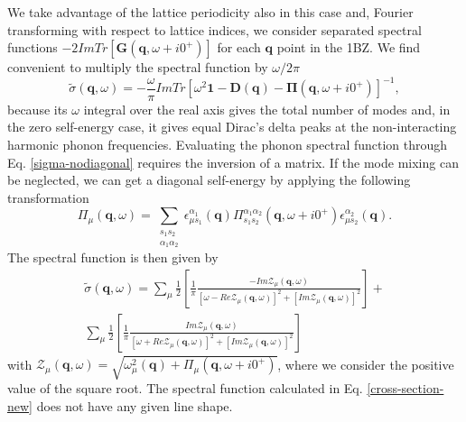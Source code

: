 We take advantage of the lattice periodicity also in this case and, Fourier transforming with respect to lattice indices, we consider separated spectral functions $-2ImTr[\boldsymbol{G}(\boldsymbol{q},\omega+i0^{+})]$ for 
each $\boldsymbol{q}$ point in the 1BZ. We find convenient to multiply the spectral function by $\omega/2\pi$
\begin{equation}
\label{sigma-nodiagonal}
\tilde{\sigma}(\mathbf{q},\omega)=-\frac{\omega}{\pi}ImTr[\omega^{2}\boldsymbol{1}-\mathbf{D}(\mathbf{q})-\boldsymbol{\Pi}(\mathbf{q},\omega+i0^{+})]^{-1},
\end{equation}
because its $\omega$ integral over the real axis gives the total number of modes and, in the zero self-energy case, it gives equal Dirac's delta peaks at the non-interacting harmonic phonon frequencies. Evaluating the 
phonon spectral function through Eq. \ref{sigma-nodiagonal} requires the inversion of a matrix. If the mode mixing can be neglected, we can get a diagonal self-energy by applying the following transformation
\begin{equation}
\Pi_{\mu}(\mathbf{q},\omega)=\sum\limits_{\substack{s_{1}s_{2} \\ \alpha_{1}\alpha_{2}}}\epsilon_{\mu s_{1}}^{\alpha_{1}}(\mathbf{q})\Pi_{s_{1}s_{2}}^{\alpha_{1}\alpha_{2}}(\mathbf{q},\omega+i0^{+})\epsilon_{
 \mu s_{2}}^{\alpha_{2}}(\mathbf{q}).
\end{equation}
The spectral function is then given by
\begin{multline}
\label{cross-section-new}
\tilde{\sigma}(\mathbf{q},\omega)=\sum_{\mu}\frac{1}{2}\left[\frac{1}{\pi}\frac{-Im\mathcal{Z}_{\mu}(\mathbf{q},\omega)}{[\omega-Re\mathcal{Z}_{\mu}(\mathbf{q},\omega)]^{2}+[Im\mathcal{Z}_{\mu}(\mathbf{q},\omega)]^{
2}}\right]+\\\sum_{\mu}\frac{1}{2}\left[\frac{1}{\pi}\frac{Im\mathcal{Z}_{\mu}(\mathbf{q},\omega)}{[\omega+Re\mathcal{Z}_{\mu}(\mathbf{q},\omega)]^{2}+[Im\mathcal{Z}_{\mu}(\mathbf{q},\omega)]^{2}}\right]
\end{multline}
with $\mathcal{Z}_{\mu}(\mathbf{q},\omega)=\sqrt{\omega_{\mu}^{2}(\mathbf{q})+\Pi_{\mu}(\mathbf{q},\omega+i0^{+})}$, where we consider the positive value of the square root.  
The spectral function calculated in Eq. \ref{cross-section-new} does not have any given line shape. \\

